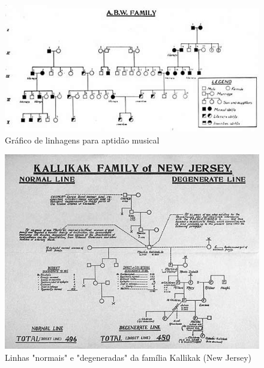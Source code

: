 \documentclass[
]{book}
\begin{document}
\hfill\break

\begin{figure}

{\centering \includegraphics[width=0.75\linewidth]{images1/chart_pedigree_music2 (1)} 

}

\caption{Gráfico de linhagens para aptidão musical}\label{fig:unnamed-chunk-17}
\end{figure}

\hfill\break

\begin{figure}

{\centering \includegraphics[width=0.75\linewidth]{images1/chart_Kallikak_pedigree2} 

}

\caption{Linhas "normais" e "degeneradas" da família Kallikak (New Jersey)}\label{fig:unnamed-chunk-18}
\end{figure}

\hfill\break
\end{document}
